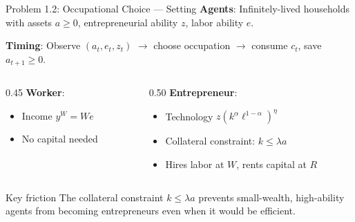 \documentclass[aspectratio=169,11pt]{beamer}
\begin{document}
\begin{frame}{Problem 1.2: Occupational Choice --- Setting}
    \small
    \textbf{Agents}: Infinitely-lived households with assets $a\ge 0$, entrepreneurial ability $z$, labor ability $e$.

    \textbf{Timing}: Observe $(a_t,e_t,z_t)$ $\to$ choose occupation $\to$ consume $c_t$, save $a_{t+1}\ge 0$.
    \vspace{0.3em}

    \begin{columns}[T]
        \begin{column}{0.45\textwidth}
            \textbf{Worker}:
            \begin{itemize}\setlength\itemsep{0pt}
                \item Income $y^W = We$
                \item No capital needed
            \end{itemize}
        \end{column}
        \begin{column}{0.50\textwidth}
            \textbf{Entrepreneur}:
            \begin{itemize}\setlength\itemsep{0pt}
                \item Technology $z(k^\alpha \ell^{1-\alpha})^\eta$
                \item Collateral constraint: $k \le \lambda a$
                \item Hires labor at $W$, rents capital at $R$
            \end{itemize}
        \end{column}
    \end{columns}
    \vspace{0.3em}
    \begin{alertblock}{Key friction}
        \small The collateral constraint $k\le\lambda a$ prevents small-wealth, high-ability agents from becoming entrepreneurs even when it would be efficient.
    \end{alertblock}
\end{frame}
\end{document}
